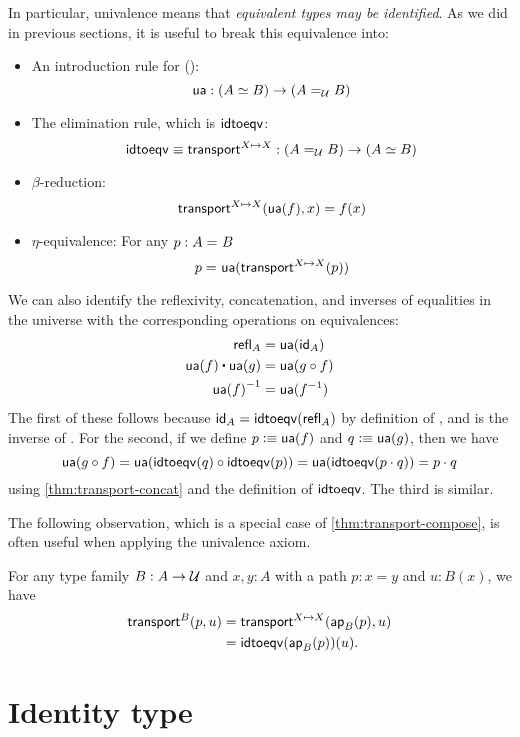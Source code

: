 In particular, univalence means that \emph{equivalent types may be identified}.
As we did in previous sections, it is useful to break this equivalence into:
%
\begin{itemize}
\item An introduction rule for {()}:
  \[
  \ua : ({\eqv A B}) \to (\id[\type]{A}{B})
  \]
\item The elimination rule, which is $\idtoeqv$:
  \[
  \idtoeqv \jdeq \transfibf{X \mapsto X} : (\id[\type]{A}{B}) \to (\eqv A B)
  \]
\item $\beta$-reduction: 
  \[
  \transfib{X \mapsto X}{\ua(f)}{x} = f(x)
  \]
\item $\eta$-equivalence: For any $p : \id A B$
  \[
  \id{p}{\ua(\transfibf{X \mapsto X}(p))}
  \]
\end{itemize}
%
We can also identify the reflexivity, concatenation, and inverses of equalities in the universe with the corresponding operations on equivalences:
\begin{align*}
  \refl{A} &= \ua(\idfunc[A]) \\
  \ua(f) \ct \ua(g) &= \ua(g\circ f) \\
  \opp{\ua(f)} &= \ua(f^{-1})
\end{align*}
The first of these follows because $\idfunc[A] = \idtoeqv(\refl{A})$ by definition of \idtoeqv, and \ua is the inverse of \idtoeqv.
For the second, if we define $p \defeq \ua(f)$ and $q\defeq \ua(g)$, then we have
\[ \ua(g\circ f) = \ua(\idtoeqv(q) \circ \idtoeqv(p)) = \ua(\idtoeqv(p\cdot q)) = p\cdot q\]
using \autoref{thm:transport-concat} and the definition of $\idtoeqv$.
The third is similar.

The following observation, which is a special case of \autoref{thm:transport-compose}, is often useful when applying the univalence axiom.

\begin{lem}\label{thm:transport-is-ap}
  For any type family $B:A\to\type$ and $x,y:A$ with a path $p:x=y$ and $u:B(x)$, we have
  \begin{align*}
    \transfib{B}{p}{u} &= \transfib{X\mapsto X}{\apfunc{B}(p)}{u}\\
    &= \idtoeqv(\apfunc{B}(p))(u).
  \end{align*}
\end{lem}


\section{Identity type}
\label{sec:compute-paths}

